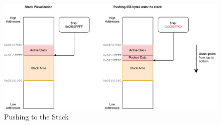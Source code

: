\begin{figure}[htp!]
    \centering
    \includegraphics[width=\textwidth]{assets/figures/stack.pdf}
    \caption{Pushing to the Stack}
    \label{fig:stack}
\end{figure}
